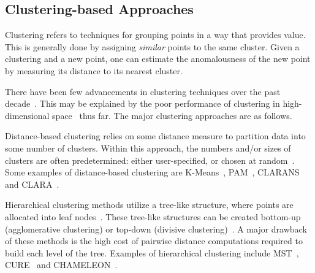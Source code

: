 \subsection{Clustering-based Approaches}
\label{subsec:introduction:clustering-based-approaches}

Clustering refers to techniques for grouping points in a way that provides value.
This is generally done by assigning \textit{similar} points to the same cluster.
Given a clustering and a new point, one can estimate the anomalousness of the new point by measuring its distance to its nearest cluster.

There have been few advancements in clustering techniques over the past decade~\cite{wang2019progress}.
This may be explained by the poor performance of clustering in high-dimensional space~\cite{zhang2013advancements} thus far.
The major clustering approaches are as follows.

Distance-based clustering relies on some distance measure to partition data into some number of clusters.
Within this approach, the numbers and/or sizes of clusters are often predetermined: either user-specified, or chosen at random~\cite{wang2019progress}.
Some examples of distance-based clustering are
K-Means~\cite{macqueen1967some},
PAM~\cite{kaufman2009finding},
CLARANS~\cite{ng1994efficient} and
CLARA~\cite{kaufman2009finding}.

Hierarchical clustering methods utilize a tree-like structure, where points are allocated into leaf nodes~\cite{wang2019progress}.
These tree-like structures can be created bottom-up (agglomerative clustering) or top-down (divisive clustering)~\cite{agrawal1998automatic}.
A major drawback of these methods is the high cost of pairwise distance computations required to build each level of the tree.
Examples of hierarchical clustering include
MST~\cite{charles_zahn_graph_1971},
CURE~\cite{guha1998cure} and
CHAMELEON~\cite{karypis1999hierarchical}.

